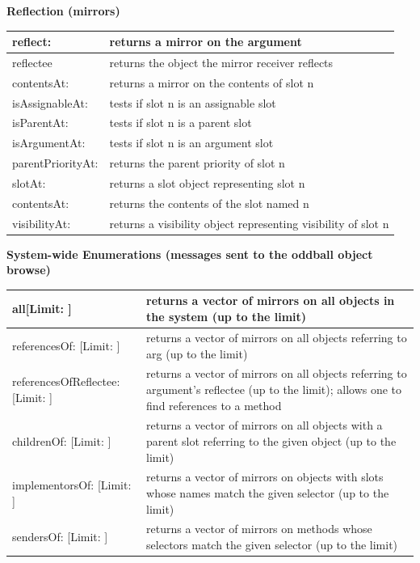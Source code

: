 \documentclass[letterpaper,10pt,english]{sphinxmanual}
\begin{document}
\textbf{Reflection (mirrors)}

\begin{tabulary}{\linewidth}{p{5cm} p{10cm}}
\hline

reflect:
 & 
returns a mirror on the argument
\\\hline

reflectee
 & 
returns the object the mirror receiver reflects
\\\hline

contentsAt:
 & 
returns a mirror on the contents of slot n
\\\hline

isAssignableAt:
 & 
tests if slot n is an assignable slot
\\\hline

isParentAt:
 & 
tests if slot n is a parent slot
\\\hline

isArgumentAt:
 & 
tests if slot n is an argument slot
\\\hline

parentPriorityAt:
 & 
returns the parent priority of slot n
\\\hline

slotAt:
 & 
returns a slot object representing slot n
\\\hline

contentsAt:
 & 
returns the contents of the slot named n
\\\hline

visibilityAt:
 & 
returns a visibility object representing visibility of slot n
\\\hline
\end{tabulary}


\textbf{System-wide Enumerations (messages sent to the oddball object browse)}

\begin{tabulary}{\linewidth}{p{5cm} p{10cm}}
\hline

all{[}Limit: {]}
 & 
returns a vector of mirrors on all objects in the system (up to the limit)
\\\hline

referencesOf: {[}Limit: {]}
 & 
returns a vector of mirrors on all objects referring to arg (up to the limit)
\\\hline

referencesOfReflectee: {[}Limit: {]}
 & 
returns a vector of mirrors on all objects referring to argument’s reflectee (up to the limit); allows one to find references to a method
\\\hline

childrenOf: {[}Limit: {]}
 & 
returns a vector of mirrors on all objects with a parent slot referring to the given object (up to the limit)
\\\hline

implementorsOf: {[}Limit: {]}
 & 
returns a vector of mirrors on objects with slots whose names match the given selector (up to the limit)
\\\hline

sendersOf: {[}Limit: {]}
 & 
returns a vector of mirrors on methods whose selectors match the given selector (up to the limit)
\\\hline
\end{tabulary}
\end{document}
